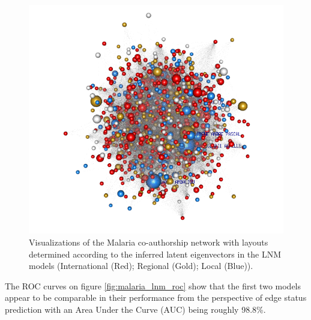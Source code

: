 \begin{figure}[!h]
\includegraphics[scale=0.3]{Chapters/malaria/statMod/lnm_mod6_all.png}
\caption{Visualizations of the Malaria co-authorship network with layouts determined according to the inferred latent eigenvectors in the LNM models (International (Red); Regional (Gold); Local (Blue)).
}
\label{fig:malaria_lnm_viz}
\end{figure}

The ROC curves on figure \ref{fig:malaria_lnm_roc} show that the first two models appear to be comparable in their performance from the perspective of edge status prediction with an Area Under the Curve (AUC) being roughly 98.8\%. %

